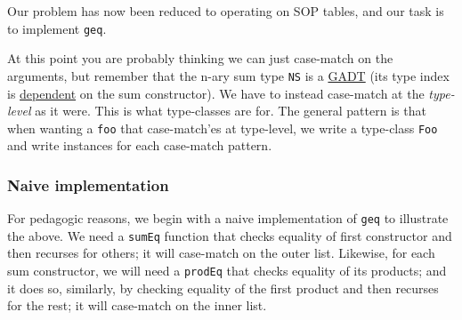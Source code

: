 Our problem has now been reduced to operating on SOP tables, and our
task is to implement \texttt{geq\textquotesingle{}}.

At this point you are probably thinking we can just case-match on the
arguments, but remember that the n-ary sum type \texttt{NS} is a
\href{https://downloads.haskell.org/~ghc/latest/docs/html/users_guide/exts/gadt.html\#gadt}{GADT}
(its type index is
\href{https://en.wikipedia.org/wiki/Dependent_type}{dependent} on the
sum constructor). We have to instead case-match at the \emph{type-level}
as it were. This is what type-classes are for. The general pattern is
that when wanting a \texttt{foo} that case-match'es at type-level, we
write a type-class \texttt{Foo} and write instances for each case-match
pattern.

\hypertarget{naive-implementation}{%
\subsubsection{Naive implementation}\label{naive-implementation}}

For pedagogic reasons, we begin with a naive implementation of
\texttt{geq\textquotesingle{}} to illustrate the above. We need a
\texttt{sumEq} function that checks equality of first constructor and
then recurses for others; it will case-match on the outer list.
Likewise, for each sum constructor, we will need a \texttt{prodEq} that
checks equality of its products; and it does so, similarly, by checking
equality of the first product and then recurses for the rest; it will
case-match on the inner list.

